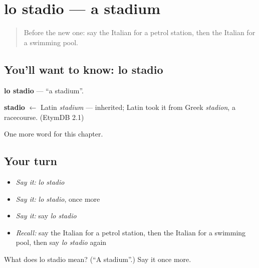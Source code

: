 \section[lo stadio]{lo stadio — a stadium}

\label{lesson:IT-C88-stadio}



\begin{quote}
Before the new one: say the Italian for a petrol station, then the Italian for a swimming pool.
\end{quote}

\subsection*{You'll want to know: lo stadio}
\textbf{lo stadio} — \textquotedblleft{}a stadium\textquotedblright{}.

\begin{cousinweb}
\textbf{stadio} $\leftarrow$ Latin \emph{stadium} — inherited; Latin took it from Greek \emph{stadion}, a racecourse. (EtymDB 2.1)
\end{cousinweb}

\begin{grammarlens}[title={What you've built}]
One more word for this chapter.
\end{grammarlens}

\subsection*{Your turn}
\begin{itemize}
\raggedright
  \item \emph{Say it:} \emph{lo stadio}
  \item \emph{Say it:} \emph{lo stadio}, once more
  \item \emph{Say it:} say \emph{lo stadio}
  \item \emph{Recall:} say the Italian for a petrol station, then the Italian for a swimming pool, then say \emph{lo stadio} again
\end{itemize}

\begin{tcolorbox}[breakable,colback=teal!4,colframe=teal!35!black,title={Before you move on}]
What does lo stadio mean? (\textquotedblleft{}A stadium\textquotedblright{}.) Say it once more.
\end{tcolorbox}
